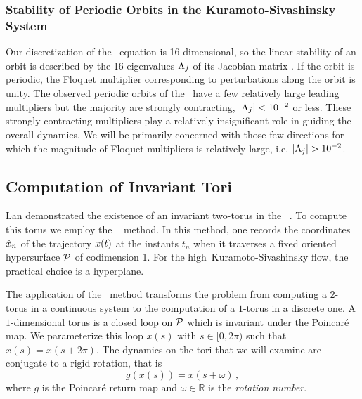 \documentclass[aip,cha,reprint,
secnumarabic,
nofootinbib, tightenlines,
nobibnotes, showkeys, showpacs,
groupedaddress
]{revtex4-1}
\begin{document}
\subsubsection{Stability of Periodic Orbits in the Kuramoto-Sivashinsky System}

Our discretization of the \KS\ equation is 16-dimensional, so the linear
stability of an orbit is described by the 16 eigenvalues $\Lambda_j$ of
its Jacobian matrix .  If the orbit is periodic, the
Floquet multiplier corresponding to perturbations along the orbit is
unity. The observed periodic orbits of the \KSe\ have a few relatively
large leading multipliers but the majority are strongly contracting,
$|\Lambda_j| <10^{-2}$ or less.  These strongly contracting multipliers
play a relatively insignificant role in guiding the overall dynamics.  We
will be primarily concerned with those few directions for which the
magnitude of Floquet multipliers is relatively large, i.e. $|\Lambda_j| >10^{-2}$.


\subsection{Computation of Invariant Tori}

Lan demonstrated the existence of an invariant two-torus in the
\KSe\ .  To compute this torus we employ the \emph{ \PoincSec\ } method.  In
this method, one records the coordinates $\hat{x}_n$ of the trajectory
$x(t)$ at the instants $t_n$ when it traverses a fixed oriented
hypersurface ${\cal P}$ of codimension 1. For the high\dmn\
Kuramoto-Sivashinsky flow, the practical choice is a hyperplane.

The application of the \PoincSec\ method transforms the problem
from computing a $2$-torus in a continuous system to the computation of a
$1$-torus in a discrete one.  A $1$-dimensional torus is a closed loop on
${\cal P}$ which is invariant under the Poincar\'e map.  We parameterize
this loop $x(s)$ with $s\in[0,2\pi)$ such that $ x (s)= x (s+2\pi)$.  The
dynamics on the tori that we will examine are conjugate to a rigid
rotation, that is
\begin{equation}
 g( x(s)) =  x(s+\omega)
\,,
\label{torusMap}
\end{equation}
where $g$ is the Poincar\'e return map and $\omega \in \mathbb{R}$ is the \emph{rotation number}.
\end{document}
